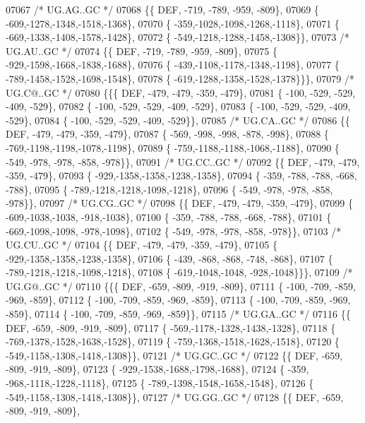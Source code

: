 \begin{DoxyCode}
07067 \textcolor{comment}{/* UG.AG..GC */}
07068 \{\{  DEF, -719, -789, -959, -809\},
07069 \{ -609,-1278,-1348,-1518,-1368\},
07070 \{ -359,-1028,-1098,-1268,-1118\},
07071 \{ -669,-1338,-1408,-1578,-1428\},
07072 \{ -549,-1218,-1288,-1458,-1308\}\},
07073 \textcolor{comment}{/* UG.AU..GC */}
07074 \{\{  DEF, -719, -789, -959, -809\},
07075 \{ -929,-1598,-1668,-1838,-1688\},
07076 \{ -439,-1108,-1178,-1348,-1198\},
07077 \{ -789,-1458,-1528,-1698,-1548\},
07078 \{ -619,-1288,-1358,-1528,-1378\}\}\},
07079 \textcolor{comment}{/* UG.C@..GC */}
07080 \{\{\{  DEF, -479, -479, -359, -479\},
07081 \{ -100, -529, -529, -409, -529\},
07082 \{ -100, -529, -529, -409, -529\},
07083 \{ -100, -529, -529, -409, -529\},
07084 \{ -100, -529, -529, -409, -529\}\},
07085 \textcolor{comment}{/* UG.CA..GC */}
07086 \{\{  DEF, -479, -479, -359, -479\},
07087 \{ -569, -998, -998, -878, -998\},
07088 \{ -769,-1198,-1198,-1078,-1198\},
07089 \{ -759,-1188,-1188,-1068,-1188\},
07090 \{ -549, -978, -978, -858, -978\}\},
07091 \textcolor{comment}{/* UG.CC..GC */}
07092 \{\{  DEF, -479, -479, -359, -479\},
07093 \{ -929,-1358,-1358,-1238,-1358\},
07094 \{ -359, -788, -788, -668, -788\},
07095 \{ -789,-1218,-1218,-1098,-1218\},
07096 \{ -549, -978, -978, -858, -978\}\},
07097 \textcolor{comment}{/* UG.CG..GC */}
07098 \{\{  DEF, -479, -479, -359, -479\},
07099 \{ -609,-1038,-1038, -918,-1038\},
07100 \{ -359, -788, -788, -668, -788\},
07101 \{ -669,-1098,-1098, -978,-1098\},
07102 \{ -549, -978, -978, -858, -978\}\},
07103 \textcolor{comment}{/* UG.CU..GC */}
07104 \{\{  DEF, -479, -479, -359, -479\},
07105 \{ -929,-1358,-1358,-1238,-1358\},
07106 \{ -439, -868, -868, -748, -868\},
07107 \{ -789,-1218,-1218,-1098,-1218\},
07108 \{ -619,-1048,-1048, -928,-1048\}\}\},
07109 \textcolor{comment}{/* UG.G@..GC */}
07110 \{\{\{  DEF, -659, -809, -919, -809\},
07111 \{ -100, -709, -859, -969, -859\},
07112 \{ -100, -709, -859, -969, -859\},
07113 \{ -100, -709, -859, -969, -859\},
07114 \{ -100, -709, -859, -969, -859\}\},
07115 \textcolor{comment}{/* UG.GA..GC */}
07116 \{\{  DEF, -659, -809, -919, -809\},
07117 \{ -569,-1178,-1328,-1438,-1328\},
07118 \{ -769,-1378,-1528,-1638,-1528\},
07119 \{ -759,-1368,-1518,-1628,-1518\},
07120 \{ -549,-1158,-1308,-1418,-1308\}\},
07121 \textcolor{comment}{/* UG.GC..GC */}
07122 \{\{  DEF, -659, -809, -919, -809\},
07123 \{ -929,-1538,-1688,-1798,-1688\},
07124 \{ -359, -968,-1118,-1228,-1118\},
07125 \{ -789,-1398,-1548,-1658,-1548\},
07126 \{ -549,-1158,-1308,-1418,-1308\}\},
07127 \textcolor{comment}{/* UG.GG..GC */}
07128 \{\{  DEF, -659, -809, -919, -809\},

\end{DoxyCode}
